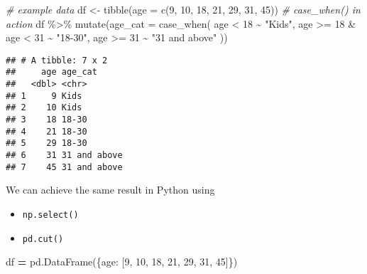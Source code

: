 \documentclass[
]{book}
\newenvironment{Shaded}{\begin{snugshade}}{\end{snugshade}}
\newcommand{\AttributeTok}[1]{\textcolor[rgb]{0.77,0.63,0.00}{#1}}
\newcommand{\CommentTok}[1]{\textcolor[rgb]{0.56,0.35,0.01}{\textit{#1}}}
\newcommand{\DecValTok}[1]{\textcolor[rgb]{0.00,0.00,0.81}{#1}}
\newcommand{\FunctionTok}[1]{\textcolor[rgb]{0.00,0.00,0.00}{#1}}
\newcommand{\NormalTok}[1]{#1}
\newcommand{\OperatorTok}[1]{\textcolor[rgb]{0.81,0.36,0.00}{\textbf{#1}}}
\newcommand{\OtherTok}[1]{\textcolor[rgb]{0.56,0.35,0.01}{#1}}
\newcommand{\SpecialCharTok}[1]{\textcolor[rgb]{0.00,0.00,0.00}{#1}}
\newcommand{\StringTok}[1]{\textcolor[rgb]{0.31,0.60,0.02}{#1}}
\begin{document}
\begin{Shaded}
\begin{Highlighting}[]
\CommentTok{\# example data}
\NormalTok{df }\OtherTok{\textless{}{-}} \FunctionTok{tibble}\NormalTok{(}\AttributeTok{age =} \FunctionTok{c}\NormalTok{(}\DecValTok{9}\NormalTok{, }\DecValTok{10}\NormalTok{, }\DecValTok{18}\NormalTok{, }\DecValTok{21}\NormalTok{, }\DecValTok{29}\NormalTok{, }\DecValTok{31}\NormalTok{, }\DecValTok{45}\NormalTok{))}
\CommentTok{\# case\_when() in action}
\NormalTok{df }\SpecialCharTok{\%\textgreater{}\%} 
  \FunctionTok{mutate}\NormalTok{(}\AttributeTok{age\_cat =} \FunctionTok{case\_when}\NormalTok{(}
\NormalTok{    age }\SpecialCharTok{\textless{}} \DecValTok{18} \SpecialCharTok{\textasciitilde{}} \StringTok{"Kids"}\NormalTok{,}
\NormalTok{    age }\SpecialCharTok{\textgreater{}=} \DecValTok{18} \SpecialCharTok{\&}\NormalTok{ age }\SpecialCharTok{\textless{}} \DecValTok{31} \SpecialCharTok{\textasciitilde{}} \StringTok{"18{-}30"}\NormalTok{,}
\NormalTok{    age }\SpecialCharTok{\textgreater{}=} \DecValTok{31} \SpecialCharTok{\textasciitilde{}} \StringTok{"31 and above"}
\NormalTok{  ))}
\end{Highlighting}
\end{Shaded}

\begin{verbatim}
## # A tibble: 7 x 2
##     age age_cat     
##   <dbl> <chr>       
## 1     9 Kids        
## 2    10 Kids        
## 3    18 18-30       
## 4    21 18-30       
## 5    29 18-30       
## 6    31 31 and above
## 7    45 31 and above
\end{verbatim}

We can achieve the same result in Python using

\begin{itemize}
\item
  \texttt{np.select()}
\item
  \texttt{pd.cut()}
\end{itemize}

\begin{Shaded}
\begin{Highlighting}[]
\NormalTok{df }\OperatorTok{=}\NormalTok{ pd.DataFrame(\{}\StringTok{\textquotesingle{}age\textquotesingle{}}\NormalTok{: [}\DecValTok{9}\NormalTok{, }\DecValTok{10}\NormalTok{, }\DecValTok{18}\NormalTok{, }\DecValTok{21}\NormalTok{, }\DecValTok{29}\NormalTok{, }\DecValTok{31}\NormalTok{, }\DecValTok{45}\NormalTok{]\})}
\end{Highlighting}
\end{Shaded}
\end{document}
